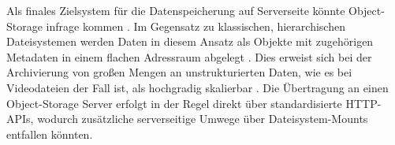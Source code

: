 Als finales Zielsystem für die Datenspeicherung auf Serverseite könnte Object-Storage infrage kommen \parencite{_what}. Im Gegensatz zu klassischen, hierarchischen Dateisystemen werden Daten in diesem Ansatz als Objekte 
mit zugehörigen Metadaten in einem flachen Adressraum abgelegt \parencite{susnjara_2025_object, _2025_what}. Dies erweist sich bei der Archivierung von großen Mengen an unstrukturierten Daten, wie es bei Videodateien der Fall ist, 
als hochgradig skalierbar \parencite{susnjara_2025_object}. Die Übertragung an einen Object-Storage Server erfolgt in der Regel direkt über standardisierte HTTP-APIs, wodurch zusätzliche serverseitige Umwege über Dateisystem-Mounts entfallen könnten.